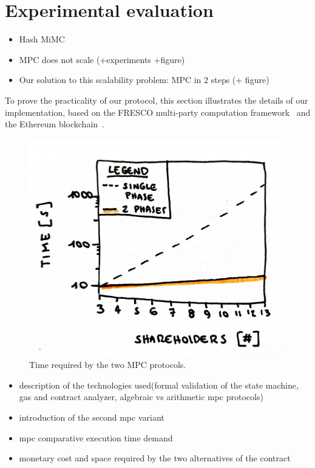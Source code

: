 \section{Experimental evaluation}\label{sect:evaluation}


\begin{itemize}
	\item Hash MiMC \cite{albrecht2016mimc}
	\item MPC does not scale (+experiments +figure)
	\item Our solution to this scalability problem: MPC in 2 steps (+ figure)
\end{itemize}


To prove the practicality of our protocol, this section illustrates the details of our implementation, based on the FRESCO multi-party computation framework~\cite{damgaard2016mpc} and the Ethereum blockchain~\cite{wood2014ethereum}.

\begin{figure}[t]
	\centering
	\includegraphics[width=0.7\columnwidth]{fig/mpc1vsmpc2}
	\caption{Time required by the two \shortname MPC protocols.}
	\label{fig:mpc1vsmpc2}
\end{figure}


\begin{itemize}
	\item description of the technologies used(formal validation of the state machine, gas and contract analyzer, algebraic vs arithmetic mpc protocols)
	\item introduction of the second mpc variant
	\item mpc comparative execution time demand
	\item monetary cost and space required by the two alternatives of the contract 
\end{itemize}




